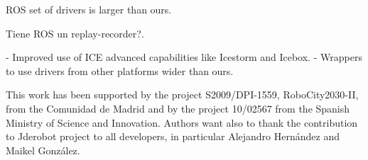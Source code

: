 \documentclass[twocolumn]{svjour3}          %
\begin{document}
ROS set of drivers is larger than ours.

Tiene ROS un replay-recorder?.

- Improved use of ICE advanced capabilities like Icestorm and Icebox.
- Wrappers to use drivers from other platforms wider than ours.

\begin{acknowledgements}
This work has been supported by the project S2009/DPI-1559, RoboCity2030-II, from the Comunidad de Madrid and by the project 10/02567 from the Spanish Ministry of Science and Innovation. Authors want also to thank the contribution to Jderobot project to all developers, in particular Alejandro Hernández and Maikel González.
\end{acknowledgements}

\end{document}
